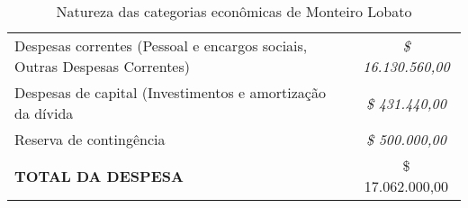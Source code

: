 \begin{table}[htbp]
	\centering
	\caption{Natureza das categorias econômicas de Monteiro Lobato}
\begin{tabular}{P{19.43em}|c}
 Despesas correntes (Pessoal e encargos sociais, Outras Despesas Correntes) & \textit{ \$       16.130.560,00 } \\
 Despesas de capital (Investimentos e amortização da dívida & \textit{ \$            431.440,00 } \\
 Reserva de contingência & \textit{ \$            500.000,00 } \\
 \textbf{TOTAL DA DESPESA} &  \$     17.062.000,00  \\
\end{tabular}%
	\label{tab:acoes_emerg}%
\end{table}%